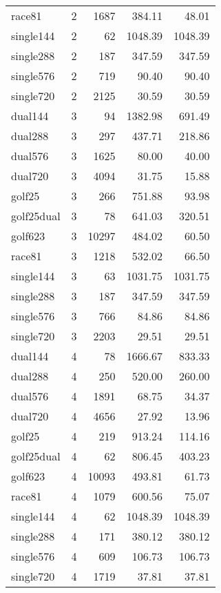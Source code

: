 \begin{longtable}[\textwidth]{lrrrr}
race81		&	2	&	1687	&	384.11	&	48.01	\\ \rowcolor{gray!15}
single144	&	2	&	62	&	1048.39	&	1048.39\\
single288	&	2	&	187	&	347.59	&	347.59	\\ \rowcolor{gray!15}
single576	&	2	&	719	&	90.40	&	90.40\\
single720	&	2	&	2125	&	30.59	&	30.59	\\ \rowcolor{gray!15}
dual144		&	3	&	94	&	1382.98	&	691.49\\
dual288		&	3	&	297	&	437.71	&	218.86	\\ \rowcolor{gray!15}
dual576		&	3	&	1625	&	80.00	&	40.00\\
dual720		&	3	&	4094	&	31.75	&	15.88	\\ \rowcolor{gray!15}
golf25		&	3	&	266	&	751.88	&	93.98\\
golf25dual	&	3	&	78	&	641.03	&	320.51	\\ \rowcolor{gray!15}
golf623		&	3	&	10297	&	484.02	&	60.50\\
race81		&	3	&	1218	&	532.02	&	66.50	\\ \rowcolor{gray!15}
single144	&	3	&	63	&	1031.75	&	1031.75\\
single288	&	3	&	187	&	347.59	&	347.59	\\ \rowcolor{gray!15}
single576	&	3	&	766	&	84.86	&	84.86\\
single720	&	3	&	2203	&	29.51	&	29.51	\\ \rowcolor{gray!15}
dual144		&	4	&	78	&	1666.67	&	833.33\\
dual288		&	4	&	250	&	520.00	&	260.00	\\ \rowcolor{gray!15}
dual576		&	4	&	1891	&	68.75	&	34.37\\
dual720		&	4	&	4656	&	27.92	&	13.96	\\ \rowcolor{gray!15}
golf25		&	4	&	219	&	913.24	&	114.16\\
golf25dual	&	4	&	62	&	806.45	&	403.23	\\ \rowcolor{gray!15}
golf623		&	4	&	10093	&	493.81	&	61.73\\
race81		&	4	&	1079	&	600.56	&	75.07	\\ \rowcolor{gray!15}
single144	&	4	&	62	&	1048.39	&	1048.39\\
single288	&	4	&	171	&	380.12	&	380.12	\\ \rowcolor{gray!15}
single576	&	4	&	609	&	106.73	&	106.73\\
single720	&	4	&	1719	&	37.81	&	37.81\\
\bottomrule[1.5pt]
\end{longtable}
